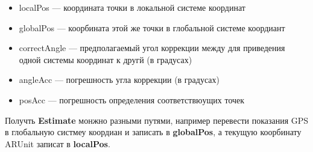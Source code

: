 \documentclass[a4paper, 11pt, titlepage]{article}
\begin{document}
        \begin{center}
        \end{center}

        \begin{itemize}
            \item localPos --- координата точки в локальной системе координат
            \item globalPos --- коорбината этой же точки в глобальной системе коордиант
            \item correctAngle --- предполагаемый угол коррекции между для приведения одной системы координат к другй (в градусах) 
            \item angleAcc --- погрешность угла коррекции (в градусах)
            \item posAcc --- погрешность определения соответствюущих точек 
        \end{itemize}

        Получть \textbf{Estimate} монжно разными путями, например перевести показания GPS в глобальную систмеу коордиан и записать в \textbf{globalPos},
        а текущую коорбинату ARUnit записат в \textbf{localPos}. 

        
\end{document}

